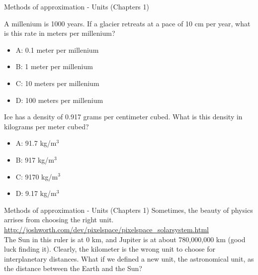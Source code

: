 \documentclass{beamer}
\begin{document}
\begin{frame}{Methods of approximation - Units (Chapters 1)}
\small
\begin{minipage}[b]{0.45\linewidth}
A millenium is 1000 years.  If a glacier retreats at a pace of 10 cm per year, what is this rate in meters per millenium?
\vspace{0.2cm}
\begin{itemize}
\item A: 0.1 meter per millenium
\item B: 1 meter per millenium
\item C: 10 meters per millenium
\item D: 100 meters per millenium
\end{itemize}
\end{minipage}
\hspace{0.5cm}
\begin{minipage}[b]{0.45\linewidth}
Ice has a density of 0.917 grams per centimeter cubed.  What is this density in kilograms per meter cubed?
\vspace{1.1cm}
\begin{itemize}
\item A: 91.7 kg/m$^3$
\item B: 917 kg/m$^3$
\item C: 9170 kg/m$^3$
\item D: 9.17 kg/m$^3$
\end{itemize}
\end{minipage}
\end{frame}

\begin{frame}{Methods of approximation - Units (Chapters 1)}
\centering
Sometimes, the beauty of physics arrises from choosing the right unit. \\
\vspace{1cm}
\small
\url{http://joshworth.com/dev/pixelspace/pixelspace\_solarsystem.html} \\
\vspace{1cm}
\normalsize
The Sun in this ruler is at 0 km, and Jupiter is at about 780,000,000 km (good luck finding it).  Clearly, the kilometer is the wrong unit to choose for interplanetary distances.  What if we defined a new unit, the \alert{astronomical unit}, as the distance between the Earth and the Sun?
\end{frame}
\end{document}
